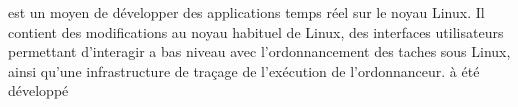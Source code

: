 \litmus est un moyen de développer des applications temps réel sur le noyau Linux. Il contient des modifications au noyau habituel de Linux, des interfaces utilisateurs permettant d’interagir a bas niveau avec l’ordonnancement des taches sous Linux, ainsi qu'une infrastructure de traçage de l'exécution de l’ordonnanceur.
\litmus à été développé